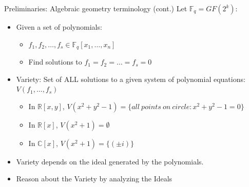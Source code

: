 \documentclass[xcolor=dvipsnames]{beamer}
\begin{document}
\begin{frame}{\large{Preliminaries: Algebraic geometry terminology (cont.)}}
Let $\mathbb{F}_q = GF(2^k)$:
\begin{itemize}
\item Given a set of polynomials:
\begin{itemize}
\item $f_1, f_2, \dots , f_s \in \mathbb{F}_q[x_1, \dots, x_n]$
\item Find solutions to $f_1 = f_2 = \dots = f_s = 0$
\end{itemize}
\item \alert{Variety:} Set of ALL solutions to a given system of polynomial equations: $V(f_1, \dots, f_s)$
	\begin{itemize}
	\item In $\mathbb{R}\left[x,y\right]$, $V(x^2+y^2-1)=\{all\  points\  on\ circle: x^2+y^2-1=0\}$
	\item In $\mathbb{R}[x]$, $V(x^2+1)=\emptyset$
	\item In $\mathbb{C}[x]$, $V(x^2+1)=\{(\pm i)\}$
	\end{itemize}
\item Variety depends on the \alert{ideal} generated by the polynomials.
\item Reason about the Variety by analyzing the Ideals
\end{itemize}
\end{frame}
\end{document}

